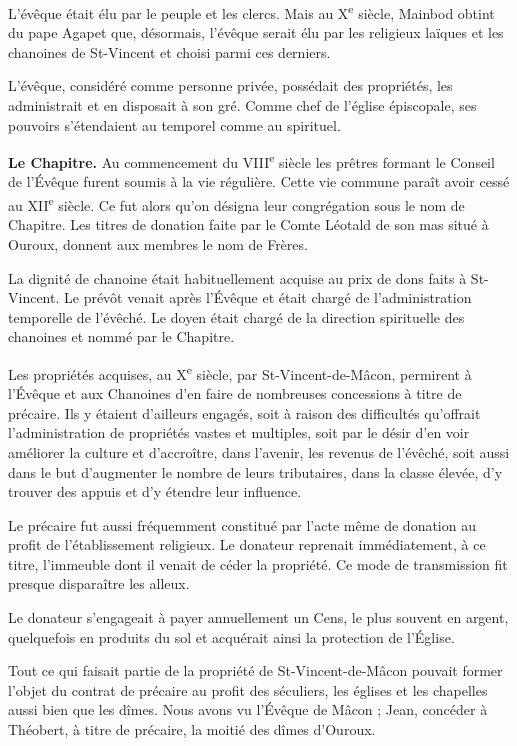 \documentclass[11pt,a4paper]{report}
\begin{document}
L'évêque était élu par le peuple et les clercs. Mais au X\textsuperscript{e}
siècle, Mainbod obtint du pape Agapet que, désormais, l'évêque serait élu par
les religieux laïques et les chanoines de St-Vincent et choisi parmi ces derniers.

L'évêque, considéré comme personne privée, possédait des propriétés, les
administrait et en disposait à son gré. Comme chef de l'église épiscopale, ses
pouvoirs s'étendaient au temporel comme au spirituel.

\textbf{Le Chapitre.} Au commencement du VIII\textsuperscript{e} siècle les
prêtres formant le Conseil de l'Évêque furent soumis à la vie régulière. Cette
vie commune paraît avoir cessé au XII\textsuperscript{e} siècle. Ce fut alors
qu'on désigna leur congrégation sous le nom de Chapitre. Les titres de donation
faite par le Comte Léotald de son mas situé à Ouroux, donnent aux membres le nom
de Frères.

La dignité de chanoine était habituellement acquise au prix de dons faits à
St-Vincent. Le prévôt venait après l'Évêque et était chargé de l'administration
temporelle de l'évêché. Le doyen était chargé de la direction spirituelle des
chanoines et nommé par le Chapitre.

Les propriétés acquises, au X\textsuperscript{e} siècle, par St-Vincent-de-Mâcon,
permirent à l'Évêque et aux Chanoines d'en faire de nombreuses concessions à
titre de précaire. Ils y étaient d'ailleurs engagés, soit à raison des
difficultés qu'offrait l'administration de propriétés vastes et multiples, soit
par le désir d'en voir améliorer la culture et d'accroître, dans l'avenir, les
revenus de l'évêché, soit aussi dans le but d'augmenter le nombre de leurs
tributaires, dans la classe élevée, d'y trouver des appuis et d'y étendre leur
influence.

Le précaire fut aussi fréquemment constitué par l'acte même de donation au
profit de l'établissement religieux. Le donateur reprenait immédiatement, à ce
titre, l'immeuble dont il venait de céder la propriété. Ce mode de transmission
fit presque disparaître les alleux.

Le donateur s'engageait à payer annuellement un Cens, le plus souvent en argent,
quelquefois en produits du sol et acquérait ainsi la protection de l'Église.

Tout ce qui faisait partie de la propriété de St-Vincent-de-Mâcon pouvait former
l'objet du contrat de précaire au profit des séculiers, les églises et les
chapelles aussi bien que les dîmes. Nous avons vu l'Évêque de Mâcon ; Jean,
concéder à Théobert, à titre de précaire, la moitié des dîmes d'Ouroux.
\end{document}
